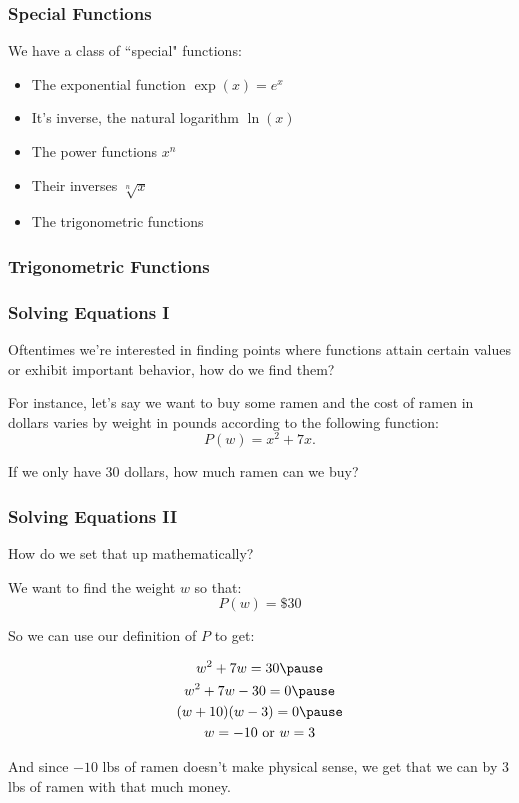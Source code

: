 \documentclass{ltx-talk}
\begin{document}
\begin{frame}
  \frametitle{Special Functions}

  We have a class of ``special" functions: \pause
  \begin{itemize}
    \item The exponential function $\exp(x) = e^x$ \pause
    \item It's inverse, the natural logarithm $\ln(x)$ \pause
    \item The power functions $x^n$ \pause
    \item Their inverses $\sqrt[n]{x}$ \pause
    \item The trigonometric functions 
  \end{itemize}
\end{frame}

\begin{frame}
  \frametitle{Trigonometric Functions}
\end{frame}

\begin{frame}
  \frametitle{Solving Equations I}
  Oftentimes we're interested in finding points where
  functions attain certain values or exhibit important behavior, \pause
  how do we find them? \pause

  For instance, let's say we want to buy some ramen
  and the cost of ramen in dollars varies by weight in pounds according to the
  following function: \pause
  $$P(w) = x^2 + 7x.$$ \pause

  If we only have 30 dollars, how much ramen can we buy?
\end{frame}

\begin{frame}
  \frametitle{Solving Equations II}
  How do we set that up mathematically? \pause

  We want to find the weight $w$ so that:
  \begin{equation}
    P(w) = \$30  
  \end{equation} \pause

  So we can use our definition of $P$ to get: \pause

  \begin{gather*}
    w^2 + 7w = 30 \pause \\
    w^2 + 7w - 30 = 0 \pause \\
    (w + 10)(w - 3) = 0 \pause \\
    w = -10 \text{ or } w = 3
  \end{gather*}

  And since $-10$ lbs of ramen doesn't make physical sense,
  we get that we can by $3$ lbs of ramen with that much money.
\end{frame}
\end{document}
